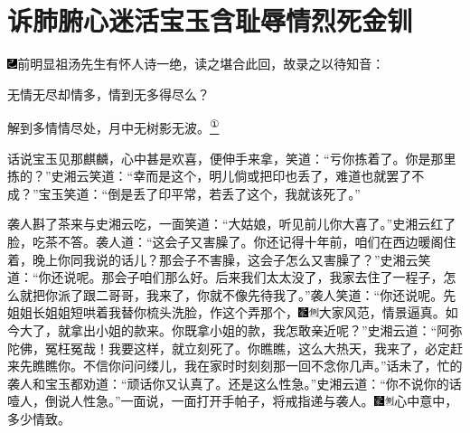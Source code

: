 

\chapter{诉肺腑心迷活宝玉\hspace{.5em}含耻辱情烈死金钏}
{\includegraphics[width=3mm]{../Images/00003}前明显祖汤先生有怀人诗一绝，读之堪合此回，故录之以待知音：}

{无情无尽却情多，情到无多得尽么？}

{解到多情情尽处，月中无树影无波。}\href{../Text/part0036_split_000.html\#lnkback_1_a}{\textsuperscript{①}}

话说宝玉见那麒麟，心中甚是欢喜，便伸手来拿，笑道：``亏你拣着了。你是那里拣的？''史湘云笑道：``幸而是这个，明儿倘或把印也丢了，难道也就罢了不成？''宝玉笑道：``倒是丢了印平常，若丢了这个，我就该死了。''

袭人斟了茶来与史湘云吃，一面笑道：``大姑娘，听见前儿你大喜了。''史湘云红了脸，吃茶不答。袭人道：``这会子又害臊了。你还记得十年前，咱们在西边暖阁住着，晚上你同我说的话儿？那会子不害臊，这会子怎么又害臊了？''史湘云笑道：``你还说呢。那会子咱们那么好。后来我们太太没了，我家去住了一程子，怎么就把你派了跟二哥哥，我来了，你就不像先待我了。''袭人笑道：``你还说呢。先姐姐长姐姐短哄着我替你梳头洗脸，作这个弄那个，{\includegraphics[width=3mm]{../Images/00006}\includegraphics[width=3mm]{../Images/00011}\footnotesize \kaishu 大家风范，情景逼真。}如今大了，就拿出小姐的款来。你既拿小姐的款，我怎敢亲近呢？''史湘云道：``阿弥陀佛，冤枉冤哉！我要这样，就立刻死了。你瞧瞧，这么大热天，我来了，必定赶来先瞧瞧你。不信你问问缕儿，我在家时时刻刻那一回不念你几声。''话未了，忙的袭人和宝玉都劝道：``顽话你又认真了。还是这么性急。''史湘云道：``你不说你的话噎人，倒说人性急。''一面说，一面打开手帕子，将戒指递与袭人。{\includegraphics[width=3mm]{../Images/00006}\includegraphics[width=3mm]{../Images/00011}\footnotesize \kaishu 心中意中，多少情致。}


